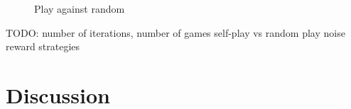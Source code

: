 \documentclass[10pt,twocolumn,letterpaper]{article}
\begin{document}
\begin{figure}[t]
    \begin{center}
		\noindent
		\makebox[3.25in]{
	   		
		}
	\end{center}
    \caption{Play against random}
	\label{fig:long}
\end{figure}

TODO:
number of iterations, number of games
self-play vs random play
noise
reward strategies
\section{Discussion}

{\small
\printbibliography
}
\end{document}
